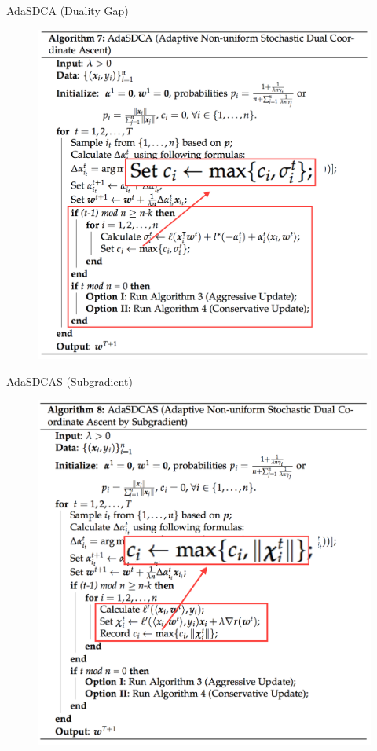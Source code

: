 \begin{frame}{AdaSDCA (Duality Gap)}
\begin{figure}[H]
        \includegraphics[height=0.8\textheight]{images/AdaSDCA.png} 
    \label{fig:AdaSDCA}
\end{figure}
\end{frame}

\begin{frame}{AdaSDCAS (Subgradient)}
\begin{figure}[H]
        \includegraphics[height=0.8\textheight]{images/AdaSDCAS.png} 
    \label{fig:AdaSDCA}
\end{figure}
\end{frame}
